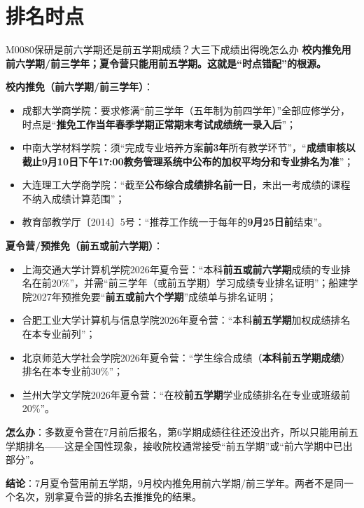 \section{排名时点}
\begin{qa}{M0080}{保研是前六学期还是前五学期成绩？大三下成绩出得晚怎么办}
\textbf{校内推免用前六学期/前三学年；夏令营只能用前五学期。这就是“时点错配”的根源。}

\textbf{校内推免（前六学期/前三学年）}：
\begin{itemize}
  \item 成都大学商学院：要求修满“前三学年（五年制为前四学年）”全部应修学分，时点是“\textbf{推免工作当年春季学期正常期末考试成绩统一录入后}”；
  \item 中南大学材料学院：须“完成专业培养方案\textbf{前3年}所有教学环节”，“\textbf{成绩审核以截止9月10日下午17:00教务管理系统中公布的加权平均分和专业排名为准}”；
  \item 大连理工大学商学院：“截至\textbf{公布综合成绩排名前一日}，未出一考成绩的课程不纳入成绩计算范围”；
  \item 教育部教学厅〔2014〕5号：“推荐工作统一于每年的\textbf{9月25日前}结束”。
\end{itemize}

\textbf{夏令营/预推免（前五或前六学期）}：
\begin{itemize}
  \item 上海交通大学计算机学院2026年夏令营：“本科\textbf{前五或前六学期}成绩的专业排名在前20\%”，并需“前三学年（或前五学期）学习成绩专业排名证明”；船建学院2027年预推免要“\textbf{前五或前六个学期}”成绩单与排名证明；
  \item 合肥工业大学计算机与信息学院2026年夏令营：“本科\textbf{前五学期}加权成绩排名在本专业前列”；
  \item 北京师范大学社会学院2026年夏令营：“学生综合成绩（\textbf{本科前五学期成绩}）排名在本专业前30\%”；
  \item 兰州大学文学院2026年夏令营：“在校\textbf{前五学期}学业成绩排名在专业或班级前20\%”。
\end{itemize}

\textbf{怎么办}：多数夏令营在7月前后报名，第6学期成绩往往还没出齐，所以只能用前五学期排名——这是全国性现象，接收院校通常接受“前五学期”或“前六学期中已出部分”。

\textbf{结论}：7月夏令营用前五学期，9月校内推免用前六学期/前三学年。两者不是同一个名次，别拿夏令营的排名去推推免的结果。
\end{qa}

